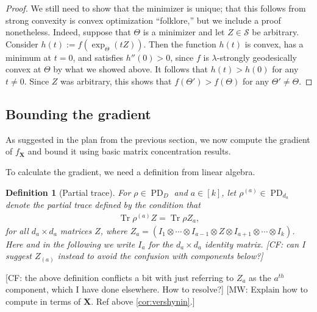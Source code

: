 \documentclass{article}
\newtheorem{definition}{Definition}
\newcommand{\ot}{\otimes}
\renewcommand{\vec}{\bm}
\newcommand\PD{\operatorname{PD}}
\newcommand\Sym{\mathcal{S}}
\newcommand\tr{\operatorname{Tr}}
\newcommand{\CF}[1]{{\color{purple}[CF: #1]}}
\newcommand{\MW}[1]{{\color{red}[MW: #1]}}
\begin{document}
\begin{proof}

We still need to show that the minimizer is unique; that this follows from strong convexity is convex optimization ``folklore,'' but we include a proof nonetheless. Indeed, suppose that $\Theta$ is a minimizer and let $Z\in \Sym$ be arbitrary.
Consider $h(t) := f(\exp_{\Theta}(tZ))$.
Then the function $h(t)$ is convex, has a minimum at $t=0$, and satisfies $h''(0) > 0$, since $f$ is $\lambda$-strongly geodesically convex at $\Theta$ by what we showed above.
It follows that $h(t) > h(0)$ for any $t\neq0$.
Since $Z$ was arbitrary, this shows that $f(\Theta') > f(\Theta)$ for any $\Theta'\neq\Theta$.
\end{proof}

\subsection{Bounding the gradient}
As suggested in the plan from the previous section, we now compute the gradient of $f_{\vec X}$ and bound it using basic matrix concentration results.

To calculate the gradient, we need a definition from linear algebra.

\begin{definition}[Partial trace]\label{def:single marginal}
For $\rho \in \PD_D$ and $a\in[k]$, let $\rho^{(a)} \in \PD_{d_a}$ denote the \emph{partial trace} defined by the condition that
\begin{align*}
  \tr \rho^{(a)} Z = \tr \rho Z_a,
\end{align*}
for all $d_a \times d_a$ matrices $Z$, where $Z_a = (I_1 \ot \cdots \ot I_{a-1} \ot Z \ot I_{a+1} \ot \cdots \ot I_k)$.
Here and in the following we write $I_a$ for the $d_a\times d_a$ identity matrix. \CF{can I suggest $Z_{(a)}$ instead to avoid the confusion with components below?}
\end{definition}
\CF{the above definition conflicts a bit with just referring to $Z_a$ as the $a^{th}$ component, which I have done elsewhere. How to resolve?}
\MW{Explain how to compute in terms of $\vec X$. Ref above \cref{cor:vershynin}.}
\end{document}
